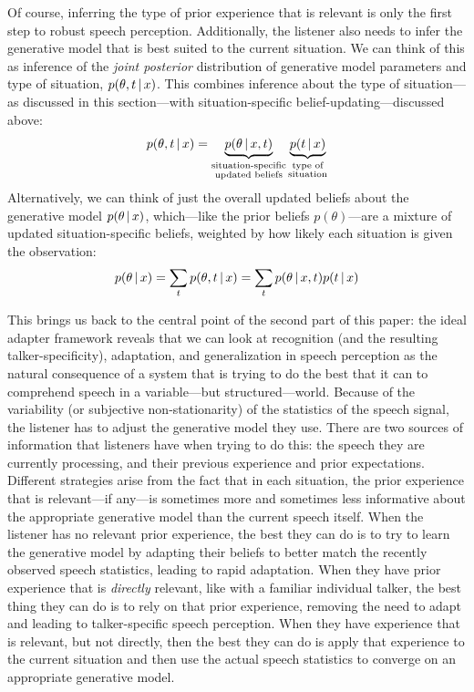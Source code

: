 Of course, inferring the type of prior experience that is relevant is only the first step to robust speech perception.  Additionally, the listener also needs to infer the generative model that is best suited to the current situation.  We can think of this as inference of the \emph{joint posterior} distribution of generative model parameters and type of situation, $p(\theta, t \,|\, x)$.  This combines inference about the type of situation---as discussed in this section---with situation-specific belief-updating---discussed above: 
\begin{equation}
  \label{eq:36}
  p(\theta, t \,|\, x) = \underbrace{p(\theta \,|\, x, t)}_{\substack{\textrm{situation-specific}\\\textrm{updated beliefs}}} \underbrace{p(t \,|\, x)}_{\substack{\textrm{type of}\\\textrm{situation}}}
\end{equation}
Alternatively, we can think of just the overall updated beliefs about the generative model $p(\theta\,|\, x)$, which---like the prior beliefs $p(\theta)$---are a mixture of updated situation-specific beliefs, weighted by how likely each situation is given the observation: 
\begin{equation}
  \label{eq:37}
  p(\theta \,|\, x) = \sum_t p(\theta, t \,|\, x) = \sum_t p(\theta \,|\, x, t) p(t \,|\, x)
\end{equation}

This brings us back to the central point of the second part of this paper: 
the ideal adapter framework reveals that we can look at recognition (and the resulting talker-specificity), adaptation, and generalization in speech perception as the natural consequence of a system that is trying to do the best that it can to comprehend speech in a variable---but structured---world.  Because of the variability (or subjective non-stationarity) of the statistics of the speech signal, the listener has to adjust the generative model they use.  There are two sources of information that listeners have when trying to do this: the speech they are currently processing, and their previous experience and prior expectations.  Different strategies arise from the fact that in each situation, the prior experience that is relevant---if any---is sometimes more and sometimes less informative about the appropriate generative model than the current speech itself.  When the listener has no relevant prior experience, the best they can do is to try to learn the generative model by adapting their beliefs to better match the recently observed speech statistics, leading to rapid adaptation.  When they have prior experience that is \emph{directly} relevant, like with a familiar individual talker, the best thing they can do is to rely on that prior experience, removing the need to adapt and leading to talker-specific speech perception.  When they have experience that is relevant, but not directly, then the best they can do is apply that experience to the current situation and then use the actual speech statistics to converge on an appropriate generative model.
 
